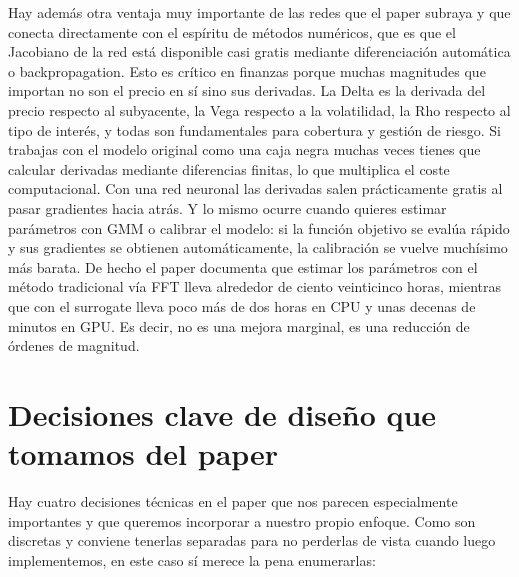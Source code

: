 \documentclass[11pt,a4paper]{article}
\begin{document}
Hay además otra ventaja muy importante de las redes que el paper subraya y que conecta directamente con el espíritu de métodos numéricos, que es que el Jacobiano de la red está disponible casi gratis mediante diferenciación automática o backpropagation. Esto es crítico en finanzas porque muchas magnitudes que importan no son el precio en sí sino sus derivadas. La Delta es la derivada del precio respecto al subyacente, la Vega respecto a la volatilidad, la Rho respecto al tipo de interés, y todas son fundamentales para cobertura y gestión de riesgo. Si trabajas con el modelo original como una caja negra muchas veces tienes que calcular derivadas mediante diferencias finitas, lo que multiplica el coste computacional. Con una red neuronal las derivadas salen prácticamente gratis al pasar gradientes hacia atrás. Y lo mismo ocurre cuando quieres estimar parámetros con GMM o calibrar el modelo: si la función objetivo se evalúa rápido y sus gradientes se obtienen automáticamente, la calibración se vuelve muchísimo más barata. De hecho el paper documenta que estimar los parámetros con el método tradicional vía FFT lleva alrededor de ciento veinticinco horas, mientras que con el surrogate lleva poco más de dos horas en CPU y unas decenas de minutos en GPU. Es decir, no es una mejora marginal, es una reducción de órdenes de magnitud.

\section*{Decisiones clave de diseño que tomamos del paper}

Hay cuatro decisiones técnicas en el paper que nos parecen especialmente importantes y que queremos incorporar a nuestro propio enfoque. Como son discretas y conviene tenerlas separadas para no perderlas de vista cuando luego implementemos, en este caso sí merece la pena enumerarlas:
\end{document}
